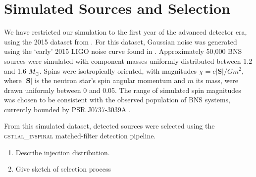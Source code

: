 \section{Simulated Sources and Selection}

We have restricted our simulation to the first year of the advanced detector era, using the 2015 dataset from \cite{Singer_2014}.  For this dataset, Gaussian noise was generated using the `early' 2015 LIGO noise curve found in \cite{Barsotti:2012}.  Approximately 50,000 BNS sources were simulated with component masses uniformly distributed between 1.2 and 1.6 $M_\odot$.  Spins were isotropically oriented, with magnitudes $\chi = c |\mathbf{S}|/G m^2$, where $|\mathbf{S}|$ is the neutron star's spin angular momentum and $m$ its mass, were drawn uniformly between 0 and 0.05.  The range of simulated spin magnitudes was chosen to be consistent with the observed population of BNS systems, currently bounded by PSR J0737-3039A \cite{Burgay_2003,Brown_2012}.

From this simulated dataset, detected sources were selected using the \textsc{gstlal_inspiral} matched-filter detection pipeline\cite{Cannon_2012}. 

\begin{enumerate}
\item Describe injection distribution.
\item Give sketch of selection process
\end{enumerate}